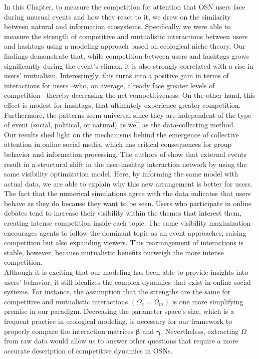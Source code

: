 In this Chapter, to measure the competition for attention that OSN users face during unusual events and how they react to it, we drew on the similarity between natural and information ecosystems. Specifically, we were able to measure the strength of competitive and mutualistic interactions between users and hashtags using a modeling approach based on ecological niche theory. Our findings demonstrate that, while competition between users and hashtags grows significantly during the event's climax, it is also strongly correlated with a rise in users' mutualism. Interestingly, this turns into a positive gain in terms of interactions for users --who, on average, already face greater levels of competition-- thereby decreasing the net competitiveness. On the other hand, this effect is modest for hashtags, that ultimately experience greater competition. Furthermore, the patterns seem universal since they are independent of the type of event (social, political, or natural) as well as the data-collecting method.\\

Our results shed light on the mechanisms behind the emergence of collective attention in online social media, which has critical consequences for group behavior and information processing. The authors of \cite{palazzi2021ecological} show that external events result in a structural shift in the user-hashtag interaction network by using the same visibility optimization model. Here, by informing the same model with actual data, we are able to explain why this new arrangement is better for users. The fact that the numerical simulations agree with the data indicates that users behave as they do because they want to be seen. Users who participate in online debates tend to increase their visibility within the themes that interest them, creating intense competition inside each topic. The same visibility maximization encourages agents to follow the dominant topic as an event approaches, raising competition but also expanding viewers. This rearrangement of interactions is stable, however, because mutualistic benefits outweigh the more intense competition. \\

Although it is exciting that our modeling has been able to provide insights into users' behavior, it still idealizes the complex dynamics that exist in online social systems. For instance, the assumption that the strengths are the same for competitive and mutualistic interactions $(\Omega_c = \Omega_m)$ is one more simplifying premise in our paradigm. Decreasing the parameter space's size, which is a frequent practice in ecological modeling, is necessary for our framework to properly compare the interaction matrices $\boldsymbol{\beta}$ and $\boldsymbol{\gamma}$. Nevertheless, extracting $\Omega$ from raw data would allow us to answer other questions that require a more accurate description of competitive dynamics in OSNs. \\

